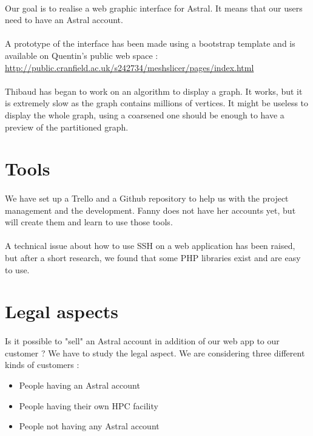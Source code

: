 \documentclass{cranfieldChart}
\begin{document}
\paragraph{}
Our goal is to realise a web graphic interface for Astral. It means that our users need to have an Astral account.

\paragraph{}
A prototype of the interface has been made using a bootstrap template and is available on Quentin's public web space : \url{http://public.cranfield.ac.uk/s242734/meshslicer/pages/index.html}

\paragraph{}
Thibaud has began to work on an algorithm to display a graph. It works, but it is extremely slow as the graph contains millions of vertices. It might be useless to display the whole graph, using a coarsened one should be enough to have a preview of the partitioned graph.

\section*{Tools}

\paragraph{}
We have set up a Trello and a Github repository to help us with the project management and the development. Fanny does not have her accounts yet, but will create them and learn to use those tools.

\paragraph{}
A technical issue about how to use SSH on a web application has been raised, but after a short research, we found that some PHP libraries exist and are easy to use.

\section*{Legal aspects}

\paragraph{}
Is it possible to "sell" an Astral account in addition of our web app to our customer ? We have to study the legal aspect. We are considering three different kinds of customers :
\begin{itemize}
	\item People having an Astral account
	\item People having their own HPC facility
	\item People not having any Astral account
\end{itemize}
\end{document}
